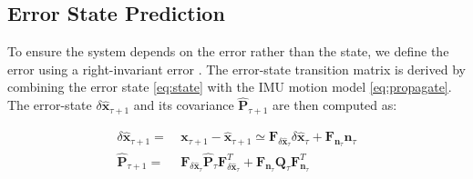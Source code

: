 \subsection{Error State Prediction}
\label{subsec:Error State Prediction}
To ensure the system depends on the error rather than the state, we define the error using a right-invariant error \cite{hartley2020contact}. The error-state transition matrix is derived by combining the error state \eqref{eq:state} with the \ac{IMU} motion model \eqref{eq:propagate}. The error-state $\delta \widehat{\textbf{x}}_{\tau+1}$ and its covariance $\widehat{\textbf{P}}_{\tau+1}$ are then computed as:

\vspace{-5mm}\small
\begin{align}
\label{eq:nominal state prop}
  \delta \widehat{\textbf{x}}_{\tau+1} =& \: {\textbf{x}}_{\tau+1} - \widehat{\textbf{x}}_{\tau+1}
  \simeq \textbf{F}_{\delta \widehat{\textbf{x}}_{\tau}}\delta \widehat{\textbf{x}}_{\tau} + \textbf{F}_{\textbf{n}_\tau} \textbf{n}_\tau \\ 
  \label{eq:transition matrix}
  \widehat{\textbf{P}}_{\tau+1} =& \: \textbf{F}_{\delta \widehat{\textbf{x}}_{\tau}}\widehat{\textbf{P}}_{\tau}\textbf{F}^T_{\delta \widehat{\textbf{x}}_{\tau}} + \textbf{F}_{\textbf{n}_\tau}\textbf{Q}_{\tau}\textbf{F}^T_{{\textbf{n}}_\tau} \nonumber
\end{align}
\normalsize

